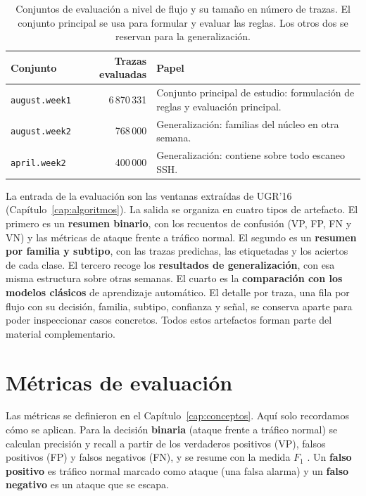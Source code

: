 \begin{table}[ht]
\centering
\small
\begin{tabular}{|l|r|p{6.0cm}|}
\hline
\textbf{Conjunto} & \textbf{Trazas evaluadas} & \textbf{Papel} \\
\hline
\texttt{august.week1} & 6\,870\,331 & Conjunto principal de estudio: formulación de reglas y evaluación principal. \\
\hline
\texttt{august.week2} & 768\,000 & Generalización: familias del núcleo en otra semana. \\
\hline
\texttt{april.week2} & 400\,000 & Generalización: contiene sobre todo escaneo SSH. \\
\hline
\end{tabular}
\caption{Conjuntos de evaluación a nivel de flujo y su tamaño en número de trazas. El conjunto principal se usa para formular y evaluar las reglas. Los otros dos se reservan para la generalización.}
\label{tab:exp_config}
\end{table}

La entrada de la evaluación son las ventanas extraídas de UGR'16 (Capítulo~\ref{cap:algoritmos}). La salida se organiza en cuatro tipos de artefacto. El primero es un \textbf{resumen binario}, con los recuentos de confusión (VP, FP, FN y VN) y las métricas de ataque frente a tráfico normal. El segundo es un \textbf{resumen por familia y subtipo}, con las trazas predichas, las etiquetadas y los aciertos de cada clase. El tercero recoge los \textbf{resultados de generalización}, con esa misma estructura sobre otras semanas. El cuarto es la \textbf{comparación con los modelos clásicos} de aprendizaje automático. El detalle por traza, una fila por flujo con su decisión, familia, subtipo, confianza y señal, se conserva aparte para poder inspeccionar casos concretos. Todos estos artefactos forman parte del material complementario.


\section{Métricas de evaluación}
\label{sec:exp_metricas}

Las métricas se definieron en el Capítulo~\ref{cap:conceptos}. Aquí solo recordamos cómo se aplican. Para la decisión \textbf{binaria} (ataque frente a tráfico normal) se calculan precisión y recall a partir de los verdaderos positivos (VP), falsos positivos (FP) y falsos negativos (FN), y se resume con la medida $F_1$ \cite{sokolova2009systematic}. Un \textbf{falso positivo} es tráfico normal marcado como ataque (una falsa alarma) y un \textbf{falso negativo} es un ataque que se escapa.

